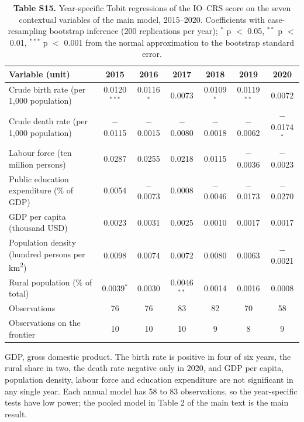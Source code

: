 \documentclass[11pt,letterpaper]{article}
\begin{document}
\begin{table}[htbp]
\footnotesize
\setlength{\tabcolsep}{4pt}
\caption{\textbf{Table S15.} Year-specific Tobit regressions of the IO--CRS score on the seven contextual variables of the main model, 2015--2020. Coefficients with case-resampling bootstrap inference (200 replications per year); $^{*}$ p $<$ 0.05, $^{**}$ p $<$ 0.01, $^{***}$ p $<$ 0.001 from the normal approximation to the bootstrap standard error.}
\begin{tabular}{@{}lcccccc@{}}
\toprule
\textbf{Variable (unit)} & \textbf{2015} & \textbf{2016} & \textbf{2017} & \textbf{2018} & \textbf{2019} & \textbf{2020} \\
\midrule
Crude birth rate (per 1,000 population) & 0.0120$^{***}$ & 0.0116$^{*}$ & 0.0073 & 0.0109$^{*}$ & 0.0119$^{**}$ & 0.0072 \\
Crude death rate (per 1,000 population) & $-$0.0115 & $-$0.0015 & $-$0.0080 & $-$0.0018 & $-$0.0062 & $-$0.0174$^{*}$ \\
Labour force (ten million persons) & 0.0287 & 0.0255 & 0.0218 & 0.0115 & $-$0.0036 & $-$0.0023 \\
Public education expenditure (\% of GDP) & 0.0054 & $-$0.0073 & 0.0008 & $-$0.0046 & $-$0.0173 & $-$0.0270 \\
GDP per capita (thousand USD) & 0.0023 & 0.0031 & 0.0025 & 0.0010 & 0.0017 & 0.0017 \\
Population density (hundred persons per km\textsuperscript{2}) & 0.0098 & 0.0074 & 0.0072 & 0.0080 & 0.0063 & $-$0.0021 \\
Rural population (\% of total) & 0.0039$^{*}$ & 0.0030 & 0.0046$^{**}$ & 0.0014 & 0.0016 & 0.0008 \\
\midrule
Observations & 76 & 76 & 83 & 82 & 70 & 58 \\
Observations on the frontier & 10 & 10 & 10 & 9 & 8 & 9 \\
\bottomrule
\end{tabular}

\vspace{4pt}
{\footnotesize GDP, gross domestic product. The birth rate is positive in four of six years, the rural share in two, the death rate negative only in 2020, and GDP per capita, population density, labour force and education expenditure are not significant in any single year. Each annual model has 58 to 83 observations, so the year-specific tests have low power; the pooled model in Table 2 of the main text is the main result.}
\end{table}
\end{document}
